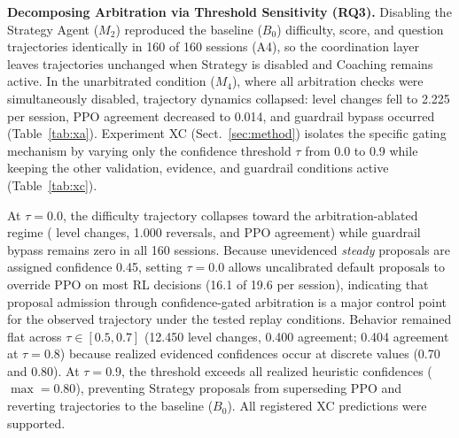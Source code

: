 \begin{table}[tbp]
\centering\scriptsize\setlength{\tabcolsep}{3pt}
\caption{Registered predictions and empirical outcomes for Experiment XA.}\label{tab:preds}

\end{table}

\noindent\textbf{Decomposing Arbitration via Threshold Sensitivity (RQ3).} Disabling the Strategy Agent ($M_2$) reproduced the baseline ($B_0$) difficulty, score, and question trajectories identically in 160 of 160 sessions (A4), so the coordination layer leaves trajectories unchanged when Strategy is disabled and Coaching remains active. In the unarbitrated condition ($M_4$), where all arbitration checks were simultaneously disabled, trajectory dynamics collapsed: level changes fell to 2.225 per session, PPO agreement decreased to 0.014, and guardrail bypass occurred (Table~\ref{tab:xa}). Experiment XC (Sect.~\ref{sec:method}) isolates the specific gating mechanism by varying only the confidence threshold $\tau$ from 0.0 to 0.9 while keeping the other validation, evidence, and guardrail conditions active (Table~\ref{tab:xc}).


\begin{table}[tbp]
\centering\scriptsize\setlength{\tabcolsep}{3pt}
\caption{Experiment XC (REPLAY, 160 sessions per row, mean per session): only confidence threshold $\tau$ varies; evidence requirements and guardrails remain active. \textbf{chg./rev.}: mean level changes and reversals; \textbf{agr.}: agreement with PPO; \textbf{strat.}: decisions from Strategy Agent; \textbf{gfire}: guardrail overrides; \textbf{byp.}: sessions with guardrail bypass.}\label{tab:xc}

\end{table}

At $\tau = 0.0$, the difficulty trajectory collapses toward the arbitration-ablated regime (\xctauzerochg{} level changes, 1.000 reversals, and \xctauzeroagr{} PPO agreement) while guardrail bypass remains zero in all 160 sessions. Because unevidenced \emph{steady} proposals are assigned confidence 0.45, setting $\tau = 0.0$ allows uncalibrated default proposals to override PPO on most RL decisions (16.1 of 19.6 per session), indicating that proposal admission through confidence-gated arbitration is a major control point for the observed trajectory under the tested replay conditions. Behavior remained flat across $\tau \in [0.5, 0.7]$ (12.450 level changes, 0.400 agreement; 0.404 agreement at $\tau = 0.8$) because realized evidenced confidences occur at discrete values (0.70 and 0.80). At $\tau = 0.9$, the threshold exceeds all realized heuristic confidences ($\max = 0.80$), preventing Strategy proposals from superseding PPO and reverting trajectories to the baseline ($B_0$). All \xcsupported{} registered XC predictions were supported.

